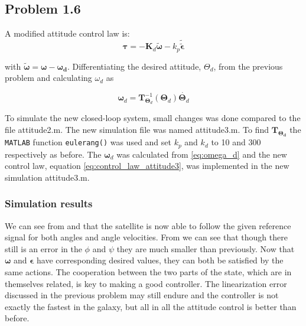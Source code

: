 \subsection*{Problem 1.6}

A modified attitude control law is:
\begin{equation}
    \boldsymbol{\tau} = -\mathbf{K}_d\tilde{\boldsymbol{\omega}} -k_p\tilde{\tilde{\boldsymbol{\epsilon}}}
    \label{eq:control_law_attitude3}
\end{equation}

with $\tilde{\boldsymbol{\omega}} = \boldsymbol{\omega} - \boldsymbol{\omega_d}$. Differentiating the desired attitude, $\Theta_d$, from the previous problem and calculating $\omega_d$ as

\begin{equation}
    \boldsymbol{\omega}_d = \mathbf{T}_{\boldsymbol{\Theta}_d}^{-1}(\boldsymbol{\Theta}_d)\dot{\boldsymbol{\Theta}_d}
    \label{eq:omega_d}
\end{equation}

To simulate the new closed-loop system, small changes was  done compared to the file {\color{blue} attitude2.m}. The new simulation file was named {\color{blue} attitude3.m}. To find $\mathbf{T}_{\boldsymbol{\Theta_d}}$ the \texttt{MATLAB} function \texttt{eulerang()} was used and set $k_p$ and $k_d$ to 10 and 300 respectively as before. The $\boldsymbol{\omega}_d$ was calculated from \eqref{eq:omega_d} and the new control law, equation \eqref{eq:control_law_attitude3}, was implemented   in the new simulation {\color{blue} attitude3.m}.

\subsubsection*{Simulation results}

We can see from  and  that the satellite is now able to follow the given reference signal for both angles and angle velocities. From  we can see that though there still is an error in the $\phi$ and $\psi$ they are much smaller than previously. Now that $\boldsymbol{\omega}$ and $\boldsymbol{\epsilon}$ have corresponding desired values, they can both be satisfied by the same actions. The cooperation between the two parts of the state, which are in themselves related, is key to making a good controller. The linearization error discussed in the previous problem may still endure and the controller is not exactly the fastest in the galaxy, but all in all the attitude control is better than before.

